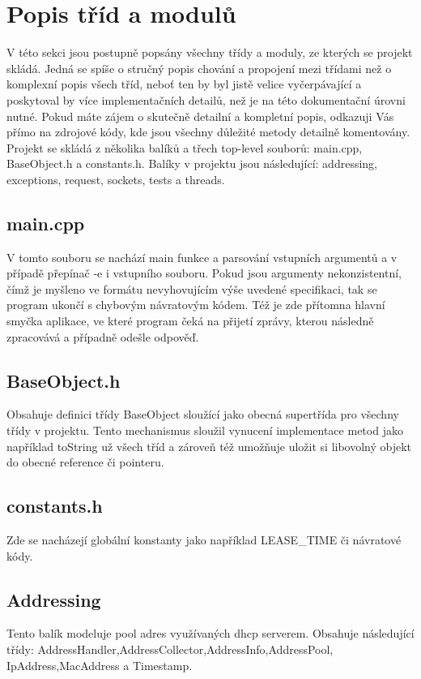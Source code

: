 \documentclass[12pt,a4paper]{report}
\begin{document}
\chapter{Popis tříd a modulů}
V této sekci jsou postupně popsány všechny třídy a moduly, ze kterých se projekt skládá.  Jedná se spíše o stručný popis chování a propojení mezi třídami než o komplexní popis všech tříd, neboť ten by byl jistě velice vyčerpávající a poskytoval by více implementačních detailů, než je na této dokumentační úrovni nutné. Pokud máte zájem o skutečně detailní a kompletní popis, odkazuji Vás přímo na zdrojové kódy, kde jsou všechny důležité metody detailně komentovány. 
Projekt se skládá z několika balíků a třech top-level  souborů: main.cpp, BaseObject.h a constants.h.
Balíky v projektu jsou následující: addressing, exceptions, request, sockets, tests a threads. 
\section*{main.cpp}
V tomto souboru se nachází main funkce a parsování vstupních argumentů a v případě přepínač -e i vstupního souboru. Pokud jsou argumenty nekonzistentní, čímž je myšleno ve formátu nevyhovujícím výše uvedené specifikaci, tak se program ukončí s chybovým návratovým kódem. Též je zde přítomna hlavní smyčka aplikace, ve které program čeká na přijetí zprávy, kterou následně zpracovává a případně odešle odpověď.
\section*{BaseObject.h}
Obsahuje definici třídy BaseObject sloužící jako obecná supertřída pro všechny třídy v projektu. Tento mechanismus sloužil vynucení implementace metod jako například toString už všech tříd a zároveň též umožňuje uložit si libovolný objekt do obecné reference či pointeru.
\section*{constants.h}
Zde se nacházejí globální konstanty jako například LEASE\_TIME či návratové kódy.
\section*{Addressing}
Tento balík modeluje pool adres využívaných dhcp serverem. Obsahuje následující třídy: AddressHandler,AddressCollector,AddressInfo,AddressPool,\\IpAddress,MacAddress a Timestamp.
\end{document}
